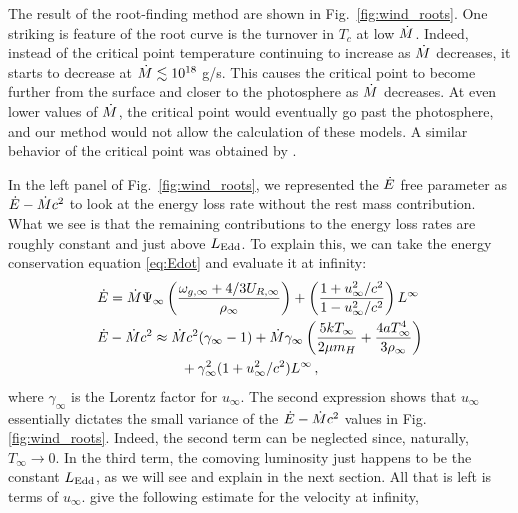\documentclass[../main.tex]{subfiles}
\begin{document}
The result of the root-finding method are shown in Fig.~\ref{fig:wind_roots}. One striking is feature of the root curve is the turnover in $T_c$ at low $\dot{M}$. Indeed, instead of the critical point temperature continuing to increase as $\dot{M}$ decreases, it starts to decrease at $\dot{M}\lesssim 10^{18}$ g/s. This causes the critical point to become further from the surface and closer to the photosphere as $\dot{M}$ decreases. At even lower values of $\dot{M}$, the critical point would eventually go past the photosphere, and our method would not allow the calculation of these models. A similar behavior of the critical point was obtained by \citet{Paczynski1986b}. 

In the left panel of Fig.~\ref{fig:wind_roots}, we represented the $\dot{E}$ free parameter as $\dot{E}-\dot{M} c^2$ to look at the energy loss rate without the rest mass contribution. What we see is that the remaining contributions to the energy loss rates are roughly constant and just above $L_\text{Edd}$. To explain this, we can take the energy conservation equation \eqref{eq:Edot} and evaluate it at infinity:
\begin{align}\label{eq:Edot_at_infty_approx}
    &\dot{E}=\dot{M}\Psi_\infty \left(\frac{\omega_{g,\infty}+4/3U_{R,\infty}}{\rho_\infty}\right)+\left(\frac{1+u_\infty^2/c^2}{1-u_\infty^2/c^2}\right)L^\infty\nonumber\\
    &\dot{E}-\dot{M} c^2\approx \dot{M} c^2(\gamma_\infty-1) + \dot{M}\gamma_\infty\left(\frac{5kT_\infty}{2\mu m_H}+\frac{4aT_\infty^4}{3\rho_\infty}\right)\nonumber\\
    &\qquad\qquad\qquad+\gamma_\infty^2(1+u_\infty^2/c^2)L^\infty\,,
\end{align}
where $\gamma_\infty$ is the Lorentz factor for $u_\infty$. The second expression shows that $u_\infty$ essentially dictates the small variance of the $\dot{E}-\dot{M} c^2$ values in Fig.\ref{fig:wind_roots}. Indeed, the second term can be neglected since, naturally, $T_\infty\rightarrow0$. In the third term, the comoving luminosity just happens to be the constant $L_\text{Edd}$, as we will see and explain in the next section. All that is left is terms of $u_\infty$. \citet{Paczynski1986b} give the following estimate for the velocity at infinity,
\end{document}
